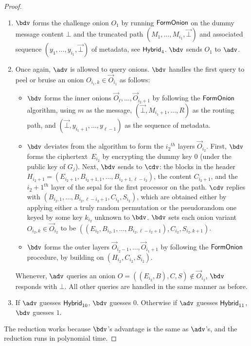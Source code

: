 \documentclass[runningheads,a4paper]{llncs}
\begin{document}
\begin{proof}
\begin{enumerate}
\item $\bdv$ forms the challenge onion $O_1$ by running $\mathsf{FormOnion}$ on the dummy message content $\bot$ and the truncated path $(M_1, \dots, M_{i_1}, \vec{\bot})$ and associated sequence $(y_1, \dots, y_{i_1}, \vec{\bot})$ of metadata, see $\mathsf{Hybrid}_{4}$. 
$\bdv$ sends $O_1$ to $\adv$.  

\item Once again, $\adv$ is allowed to query onions. $\bdv$ handles the first query to peel or bruise an onion $O_{i_1, k} \in \vec{O}_{i_1}$ as follows:  
\begin{itemize}
    \item $\bdv$ forms the inner onions $\vec{O}_\ell, \dots, \vec{O}_{i_2+1}$ by following the $\mathsf{FormOnion}$ algorithm, using $m$ as the message, $(\vec{\bot}, M_{i_1+1}, \dots, R)$ as the routing path, and $(\vec{\bot}, y_{i_1+1}, \dots, y_{\ell-1})$ as the sequence of metadata. 

    \item $\bdv$ deviates from the algorithm to form the ${i_2}^\mathit{th}$ layers $\vec{O}_{i_2}$. First, $\bdv$ forms the ciphertext~$E_{i_2}$ by encrypting  the dummy key $0$ (under the public key of $G_{j}$). Next, $\bdv$ sends to $\cdv$: the blocks in the header $H_{i_2+1} = (E_{i_2+1}, B_{i_2+1,1}, \dots, B_{i_2+1, \ell-i_2})$, the content $C_{i_2+1}$, and the $i_2+1^\mathit{th}$ layer of the sepal for the first processor on the path. $\cdv$ replies with $(B_{i_2, 1}, \dots, B_{i_2, \ell-i_2+1}, C_{i_2}, S_{i_2})$, which are obtained either by applying either a truly random permutation or the pseudorandom one keyed by some key $k_{i_2}$ unknown to $\bdv$. $\bdv$ sets each onion variant $O_{i_2, k} \in \vec{O}_{i_2}$ to be $((E_{i_2}, B_{i_2, 1}, \dots, B_{i_2, \ell-i_2+1}), C_{i_2}, S_{i_2, k+1})$.

    \item  $\bdv$ forms the outer layers $\vec{O}_{i_2-1}, \dots, \vec{O}_{i_1+1}$ by following the $\mathsf{FormOnion}$ procedure, by building on $(H_{i_2}, C_{i_2}, S_{i_2})$. 
\end{itemize}
Whenever, $\adv$ queries an onion $O = ((E_{i_2}, B), C, S) \not\in \vec{O}_{i_2}$, $\bdv$ responds with $\bot$. 
All other queries are handled in the same manner as before. 

\item If $\adv$ guesses $\mathsf{Hybrid}_{10}$, $\bdv$ guesses $0$. Otherwise if $\adv$ guesses $\mathsf{Hybrid}_{11}$, $\bdv$ guesses $1$. 
\end{enumerate}
The reduction works because $\bdv$'s advantage is the same as $\adv$'s, and the reduction runs in polynomial time. 
\end{proof}
\end{document}
